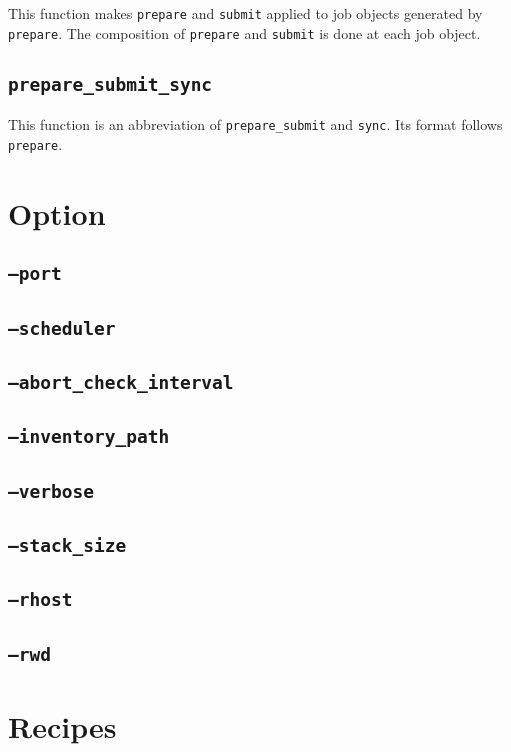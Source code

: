 \documentclass[a4paper,10pt]{report}
\begin{document}
This function makes \texttt{prepare} and \texttt{submit} applied to
job objects generated by \texttt{prepare}.  The composition of
\texttt{prepare} and \texttt{submit} is done at each job object.

\section{\texttt{prepare\_submit\_sync}}

This function is an abbreviation of \texttt{prepare\_submit} and
\texttt{sync}.  Its format follows \texttt{prepare}.

\chapter{Option}\label{chapoption}

\section{\texttt{--port}}
\section{\texttt{--scheduler}}
\section{\texttt{--abort\_check\_interval}}
\section{\texttt{--inventory\_path}}
\section{\texttt{--verbose}}
\section{\texttt{--stack\_size}}
\section{\texttt{--rhost}}
\section{\texttt{--rwd}}


\appendix
\chapter{Recipes}
\end{document}
